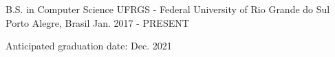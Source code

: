\begin{cventries}
  \cventry
    {B.S. in Computer Science}
    {UFRGS - Federal University of Rio Grande do Sul}
    {Porto Alegre, Brasil}
    {Jan. 2017 - PRESENT}
    {
      \begin{cvitems}
        \item {Anticipated graduation date: Dec. 2021}
      \end{cvitems}
    }
\end{cventries}
